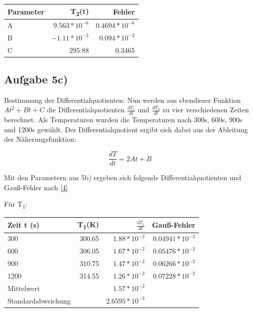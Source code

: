 \documentclass[titlepage=firstcover, captions=tableheading]{scrartcl}
\begin{document}
\begin{center}
\begin{tabular}{
    l
    r
    @{${}\pm{}$}
    r
}
    \toprule
    {Parameter} & {T\textsubscript{2}(t)} & {Fehler} \\
    \midrule
    A & $9.563 * 10^{-6} $ &  $0.4694 * 10^{-6} $ \\
    B & $ -1.11 * 10^{-2} $&  $ 0.094 * 10^{-2} $ \\
    C & 295.88 &  0.3465 \\
    \bottomrule
\end{tabular}
\end{center}

\subsection{Aufgabe 5c)}
Bestimmung der Differentialquotienten: 
Nun werden aus ebendieser Funktion $At^2+Bt+C$ die Differentialquotienten $\frac{dT_1}{dt}$ und $\frac{dT_2}{dt}$  zu vier verschiedenen Zeiten berechnet. 
Als Temperaturen wurden die Temperaturen nach 300s, 600s, 900s und 1200s gewählt. 
Der Differentialquotient ergibt sich dabei aus der Ableitung der Näherungsfunktion: 

\begin{displaymath}
    \frac{dT}{dt}=2At+B
\end{displaymath}

\noindent Mit den Parametern aus 5b) ergeben sich folgende Differentialquotienten und Gauß-Fehler nach \eqref{4}

Für T\textsubscript{1}:
\begin{center}
    \begin{tabular}{
        l
        r
        r
        r
    }
        \toprule
        {Zeit t (s)} & {T\textsubscript{1}(K)} & {$\frac{dT_1}{dt} $} & {Gauß-Fehler} \\
        \midrule
        300 & 300.65 &  $1.88  * 10^{-2}$& $0.04941 * 10^{-2}$ \\
        600 & 306.05 &  $1.67  * 10^{-2}$& $0.05476 * 10^{-2}$\\
        900 & 310.75 &  $1.47  * 10^{-2}$& $0.06266 * 10^{-2}$\\
        1200 & 314.55 & $ 1.26 * 10^{-2}$ & $0.07228 * 10^{-2}$ \\
        \midrule
        Mittelwert & & $1.57*10^{-2}$ & \\
        Standardabweichung & & $2.6595*10^{-3}$ \\
        \bottomrule
    \end{tabular}
    \end{center}
\end{document}
